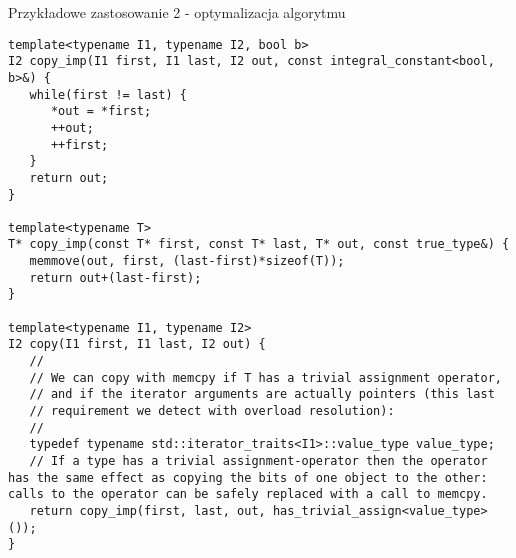 \documentclass[11pt]{beamer}
\begin{document}
\begin{frame}[fragile]{Przykładowe zastosowanie 2 - optymalizacja algorytmu}
 \begin{lstlisting}[frame=single,basicstyle=\tiny]
template<typename I1, typename I2, bool b>
I2 copy_imp(I1 first, I1 last, I2 out, const integral_constant<bool, b>&) {
   while(first != last) {
      *out = *first;
      ++out;
      ++first;
   }
   return out;
}

template<typename T>
T* copy_imp(const T* first, const T* last, T* out, const true_type&) {
   memmove(out, first, (last-first)*sizeof(T));
   return out+(last-first);
}

template<typename I1, typename I2>
I2 copy(I1 first, I1 last, I2 out) {
   //
   // We can copy with memcpy if T has a trivial assignment operator,
   // and if the iterator arguments are actually pointers (this last
   // requirement we detect with overload resolution):
   //
   typedef typename std::iterator_traits<I1>::value_type value_type;
   // If a type has a trivial assignment-operator then the operator has the same effect as copying the bits of one object to the other: calls to the operator can be safely replaced with a call to memcpy.
   return copy_imp(first, last, out, has_trivial_assign<value_type>());
}
    \end{lstlisting}
\end{frame}
\end{document}
